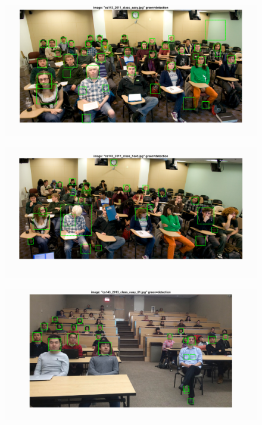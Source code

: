 \documentclass{article}
\begin{document}
\begin{figure}[!htb]
 \centering
  \includegraphics[width=.99\textwidth]{extra_easy1.png}
\end{figure}%
\begin{figure}[!htb]
  \centering
  \includegraphics[width=.99\textwidth]{extra_hard1.png}
\end{figure}%
\newpage
\begin{figure}[!htb]
  \centering
  \includegraphics[width=.99\textwidth]{extra_easy2.png}
\end{figure}%
\end{document}
